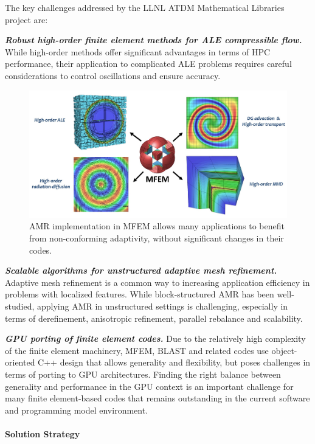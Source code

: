 The key challenges addressed by the LLNL ATDM Mathematical Libraries project are:

\noindent
{\bf \em Robust high-order finite element methods for ALE compressible flow.}
While high-order methods offer significant advantages in terms of HPC performance,
their application to complicated ALE problems requires careful considerations to
control oscillations and ensure accuracy.

\begin{figure}[htb]
\centering
\includegraphics[width=\textwidth]{projects/2.3.3-MathLibs/2.3.3.03-LLNL-ATDM-MathLibs/mfem-amr}
\caption{\label{fig:mfem-amr}AMR implementation in MFEM allows many applications to benefit from non-conforming adaptivity, without significant changes in their codes.}
\end{figure}

\noindent
{\bf \em Scalable algorithms for unstructured adaptive mesh refinement.}
Adaptive mesh refinement is a common way to increasing application efficiency
in problems with localized features. While block-structured AMR has been
well-studied, applying AMR in unstructured settings is challenging, especially
in terms of derefinement, anisotropic refinement, parallel rebalance and
scalability.

\noindent
{\bf \em GPU porting of finite element codes.}
Due to the relatively high complexity of the finite element machinery, MFEM,
BLAST and related codes use object-oriented C++ design that allows generality
and flexibility, but poses challenges in terms of porting to GPU architectures.
Finding the right balance between generality and performance in the GPU context
is an important challenge for many finite element-based codes that remains
outstanding in the current software and programming model environment.

\paragraph{Solution Strategy}

